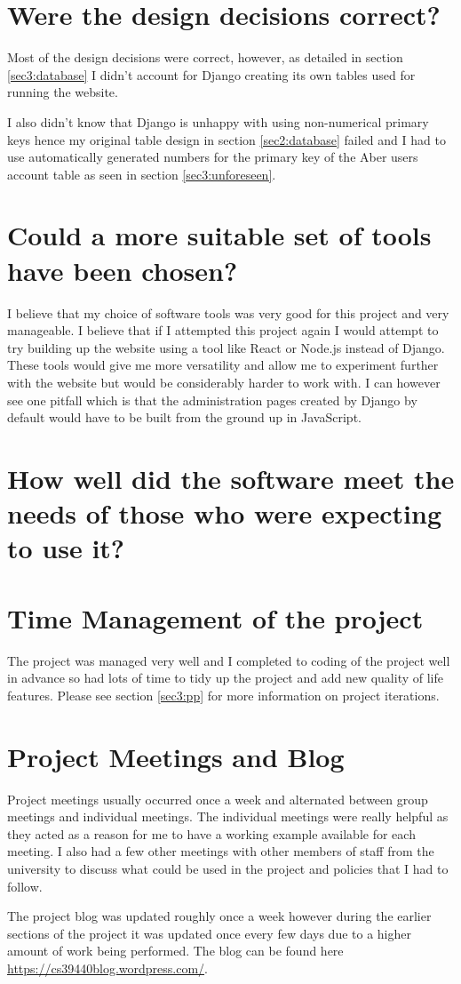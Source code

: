 \section{Were the design decisions correct?}
Most of the design decisions were correct, however, as detailed in section \ref{sec3:database} I didn't account for Django creating its own tables used for running the website. 

I also didn't know that Django is unhappy with using non-numerical primary keys hence my original table design in section \ref{sec2:database} failed and I had to use automatically generated numbers for the primary key of the Aber users account table as seen in section \ref{sec3:unforeseen}.

\section{Could a more suitable set of tools have been chosen?}
I believe that my choice of software tools was very good for this project and very manageable. I believe that if I attempted this project again I would attempt to try building up the website using a tool like React or Node.js instead of Django. These tools would give me more versatility and allow me to experiment further with the website but would be considerably harder to work with. I can however see one pitfall which is that the administration pages created by Django by default would have to be built from the ground up in JavaScript.

\section{How well did the software meet the needs of those who were expecting to use it?}

\section{Time Management of the project}
The project was managed very well and I completed to coding of the project well in advance so had lots of time to tidy up the project and add new quality of life features. Please see section \ref{sec3:pp} for more information on project iterations.

\section{Project Meetings and Blog}
Project meetings usually occurred once a week and alternated between group meetings and individual meetings. The individual meetings were really helpful as they acted as a reason for me to have a working example available for each meeting. I also had a few other meetings with other members of staff from the university to discuss what could be used in the project and policies that I had to follow. 

The project blog was updated roughly once a week however during the earlier sections of the project it was updated once every few days due to a higher amount of work being performed. The blog can be found here \href{https://cs39440blog.wordpress.com/}{https://cs39440blog.wordpress.com/}.